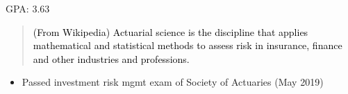 


GPA: 3.63

\vspace{5mm}

\begin{quote}

{\normalsize \textcolor{black}{(From Wikipedia) Actuarial science is the discipline that applies mathematical and statistical methods to assess risk in insurance, finance and other industries and professions.}}
\end{quote}


\vspace{6mm}


\begin{itemize}
\item Passed investment risk mgmt exam of Society of Actuaries (May 2019)
\end{itemize}

%
%
%
%
%
%
%

